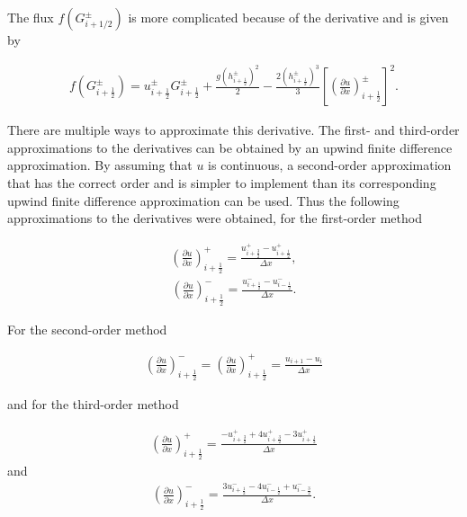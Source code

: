 \documentclass[SingleSpace,12pt,Proceedings]{Serre_ASCE}
\begin{document}
The flux $f(G^\pm_{i + 1/2})$ is more complicated because of the derivative and is given by
\begin{linenomath*}
\begin{gather*} %
f\left(G^\pm_{i + \frac{1}{2}}\right)= u^\pm_{i + \frac{1}{2}} G^\pm_{i + \frac{1}{2}} + \frac{g \left(h^\pm_{i + \frac{1}{2}} \right)^2}{2} - \frac{2 \left(h^\pm_{i + \frac{1}{2}} \right)^3}{3} \left[\left(\frac{\partial u}{\partial x}\right)^\pm_{i + \frac{1}{2}}\right]^2.
\end{gather*}
\end{linenomath*}
There are multiple ways to approximate this derivative. The first- and third-order approximations to the derivatives can be obtained by an upwind finite difference approximation. By assuming that $u$ is continuous, a second-order approximation that has the correct order and is simpler to implement than its corresponding upwind finite difference approximation can be used. Thus the following approximations to the derivatives were obtained, for the first-order method
\begin{linenomath*}
\begin{gather*} %
\left(\frac{\partial u}{\partial x}\right)^+_{i + \frac{1}{2}} = \frac{ u^+_{i + \frac{3}{2}} - u^+_{i + \frac{1}{2}}}{\Delta x},
\end{gather*}
\begin{gather*}\label{eq:derivdisco1m}
\left(\frac{\partial u}{\partial x}\right)^-_{i + \frac{1}{2}} = \frac{ u^-_{i + \frac{1}{2}} - u^-_{i - \frac{1}{2}}}{\Delta x}.
\end{gather*}
\end{linenomath*}
For the second-order method
\begin{linenomath*}
\begin{gather*} %
\left(\frac{\partial u}{\partial x}\right)^-_{i + \frac{1}{2}} = \left(\frac{\partial u}{\partial x}\right)^+_{i + \frac{1}{2}} = \frac{u_{i + 1} - u_{i}}{\Delta x}
\end{gather*}
\end{linenomath*}
and for the third-order method
\begin{linenomath*}
\begin{gather*} %
\left(\frac{\partial u}{\partial x}\right)^+_{i + \frac{1}{2}} = \frac{ -u^+_{i + \frac{3}{2}} + 4u^+_{i + \frac{3}{2}}  -3 u^+_{i + \frac{1}{2}}}{\Delta x}
\end{gather*}
and
\begin{gather*} %
\left(\frac{\partial u}{\partial x}\right)^-_{i + \frac{1}{2}} = \frac{ 3u^-_{i + \frac{1}{2}} - 4u^-_{i - \frac{1}{2}} + u^-_{i - \frac{3}{2}}}{\Delta x}.
\end{gather*}
\end{linenomath*}
\end{document}
